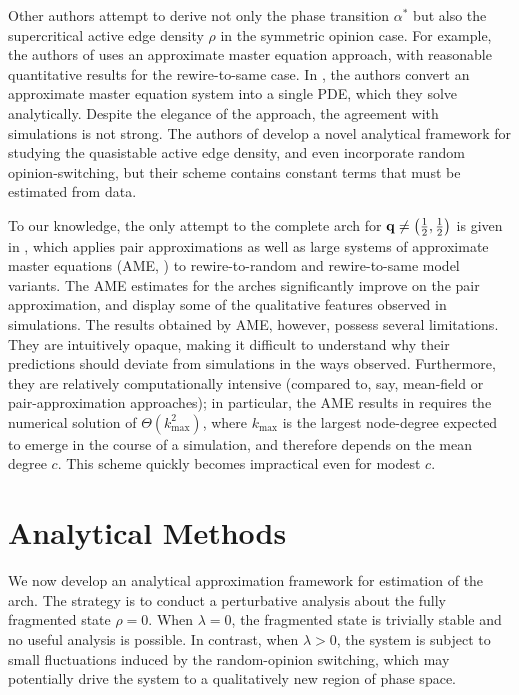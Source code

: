 \documentclass[review, onefignum, onetabnum]{siamart171218}
\begin{document}
		Other authors attempt to derive not only the phase transition $\alpha^*$ but also the supercritical active edge density $\rho$ in the symmetric opinion case. 
		For example, the authors of \cite{Demirel2012} uses an approximate master equation approach, with reasonable quantitative results for the rewire-to-same case. 
		In \cite{Silk2014}, the authors convert an approximate master equation system into a single PDE, which they solve analytically. 
		Despite the elegance of the approach, the agreement with simulations is not strong. 
		The authors of \cite{Ji2013}  develop a novel analytical framework for studying the quasistable active edge density, and even incorporate random opinion-switching, but their scheme contains constant terms that must be estimated from data. 
			
		To our knowledge, the only attempt to the complete arch for $\mathbf{q} \neq \left(\frac{1}{2}, \frac{1}{2}\right)$ is given in \cite{Durrett2012}, which applies pair approximations as well as large systems of approximate master equations (AME, \cite{Gleeson2013}) to rewire-to-random and rewire-to-same model variants. 
		The AME estimates for the arches significantly improve on the pair approximation, and display some of the qualitative features observed in simulations. 
		The results obtained by AME, however, possess several limitations. 
		They are intuitively opaque, making it difficult to understand why their predictions should deviate from simulations in the ways observed.  
		Furthermore, they are relatively computationally intensive (compared to, say, mean-field or pair-approximation approaches); in particular, the AME results in \cite{Durrett2012} requires the numerical solution of $\Theta(k_\mathrm{max}^2)$, where $k_\mathrm{max}$ is the largest node-degree expected to emerge in the course of a simulation, and therefore depends on the mean degree $c$. 
		This scheme quickly becomes impractical even for modest $c$. 

	\section{Analytical Methods}
	    We now develop an analytical approximation framework for estimation of the arch. 
	    The strategy is to conduct a perturbative analysis about the fully fragmented state $\rho = 0$. 
	    When $\lambda = 0$, the fragmented state is trivially stable and no useful analysis is possible. 
	    In contrast, when $\lambda > 0$, the system is subject to small fluctuations induced by the random-opinion switching, which may potentially drive the system to a qualitatively new region of phase space. 
	    
\end{document}
